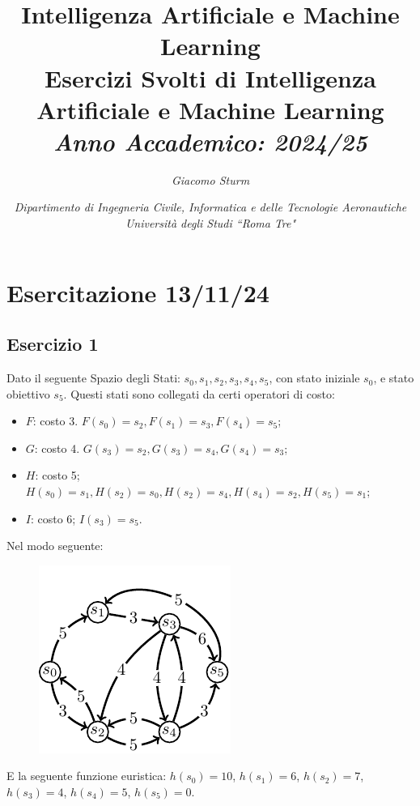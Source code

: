 \documentclass{article}
\numberwithin{equation}{section}
\begin{document}
\title{%
    \textbf{Intelligenza Artificiale e Machine Learning}  \\ 
    \large Esercizi Svolti di Intelligenza Artificiale e Machine Learning \\
    \textit{Anno Accademico: 2024/25}}
\author{\textit{Giacomo Sturm}}
\date{\textit{Dipartimento di Ingegneria Civile, Informatica e delle Tecnologie Aeronautiche \\
Università degli Studi ``Roma Tre"}}

\maketitle
\thispagestyle{link}

\clearpage


\pagestyle{fancy}
\fancyhead{}\fancyfoot{}
\fancyfoot[C]{\thepage}

\tableofcontents

\clearpage
{}

\section{Esercitazione 13/11/24}

\subsection*{Esercizio 1}

Dato il seguente Spazio degli Stati: $s_0,s_1,s_2,s_3,s_4,s_5$, con stato iniziale $s_0$, e stato obiettivo $s_5$. 
Questi stati sono collegati da certi operatori di costo:
\begin{itemize}
    \item $F$: costo 3. $F(s_0)=s_2, F(s_1)=s_3, F(s_4)=s_5$;
    \item $G$: costo 4. $G(s_3)=s_2, G(s_3)=s_4, G(s_4)=s_3$;
    \item $H$: costo 5; $H(s_0)=s_1, H(s_2)=s_0, H(s_2)=s_4, H(s_4)=s_2, H(s_5)=s_1$;
    \item $I$: costo 6; $I(s_3)=s_5$.
\end{itemize}
Nel modo seguente: 

\begin{figure}[H]%
    \centering%
    \includegraphics[scale=1.2]{grafo_esercitazione_1.pdf}%
\end{figure}
E la seguente funzione euristica: $h(s_0)=10$, $h(s_1)=6$, $h(s_2)=7$, $h(s_3)=4$, $h(s_4)=5$, $h(s_5)=0$. 
\end{document}
